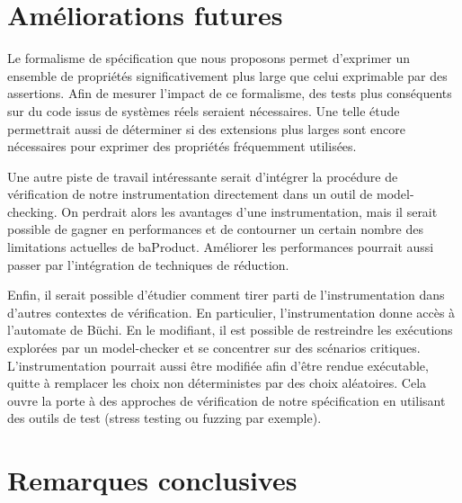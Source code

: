 
\section{Améliorations futures}

Le formalisme de spécification que nous proposons permet d'exprimer un ensemble
de propriétés significativement plus large que celui exprimable par des
assertions. Afin de mesurer l'impact de ce formalisme, des tests plus conséquents
sur du code issus de systèmes réels seraient nécessaires. Une telle étude
permettrait aussi de déterminer si des extensions plus larges sont encore
nécessaires pour exprimer des propriétés fréquemment utilisées.

Une autre piste de travail intéressante serait d'intégrer la procédure de
vérification de notre instrumentation directement dans un outil de
model-checking. On perdrait alors les avantages d'une instrumentation, mais il
serait possible de gagner en performances et de contourner un certain nombre des
limitations actuelles de baProduct. Améliorer les performances pourrait aussi
passer par l'intégration de techniques de réduction.

Enfin, il serait possible d'étudier comment tirer parti de l'instrumentation dans
d'autres contextes de vérification. En particulier, l'instrumentation donne
accès à l'automate de Büchi. En le modifiant, il est possible de restreindre les
exécutions explorées par un model-checker et se concentrer sur des scénarios
critiques. L'instrumentation pourrait aussi être modifiée afin d'être rendue
exécutable, quitte à remplacer les choix non déterministes par des choix
aléatoires. Cela ouvre la porte à des approches de vérification de notre
spécification en utilisant des outils de test (stress testing ou fuzzing par
exemple).

\section{Remarques conclusives}


